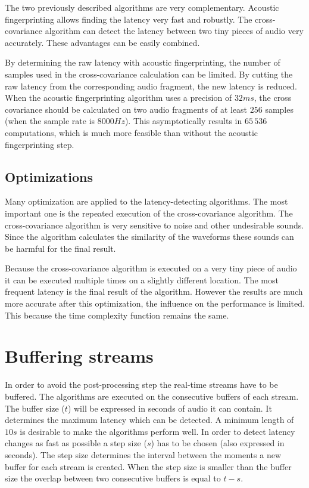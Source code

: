 \documentclass[twocolumn]{phdsymp} %
\begin{document}
The two previously described algorithms are very complementary. Acoustic fingerprinting allows finding the latency very fast and robustly. The cross-covariance algorithm can detect the latency between two tiny pieces of audio very accurately. These advantages can be easily combined.

By determining the raw latency with acoustic fingerprinting, the number of samples used in the cross-covariance calculation can be limited. By cutting the raw latency from the corresponding audio fragment, the new latency is reduced. When the acoustic fingerprinting algorithm uses a precision of $32ms$, the cross covariance should be calculated on two audio fragments of at least $256$ samples (when the sample rate is $8000Hz$). This asymptotically results in $65\,536$ computations, which is much more feasible than without the acoustic fingerprinting step.

\subsection{Optimizations}

Many optimization are applied to the latency-detecting algorithms. The most important one is the repeated execution of the cross-covariance algorithm. The cross-covariance algorithm is very sensitive to noise and other undesirable sounds. Since the algorithm calculates the similarity of the waveforms these sounds can be harmful for the final result.

Because the cross-covariance algorithm is executed on a very tiny piece of audio it can be executed multiple times on a slightly different location. The most frequent latency is the final result of the algorithm. However the results are much more accurate after this optimization, the influence on the performance is limited. This because the time complexity function remains the same.

\section{Buffering streams}

In order to avoid the post-processing step the real-time streams have to be buffered.
The algorithms are executed on the consecutive buffers of each stream. The buffer size ($t$) will be expressed in seconds of audio it can contain. It determines the maximum latency which can be detected. A minimum length of $10s$ is desirable to make the algorithms perform well. In order to detect latency changes as fast as possible a step size ($s$) has to be chosen (also expressed in seconds). The step size determines the interval between the moments a new buffer for each stream is created. When the step size is smaller than the buffer size the overlap between two consecutive buffers is equal to $ t - s $.
\end{document}
